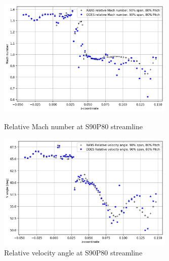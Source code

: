 \begin{figure}[ht]
  \centering
  \includegraphics[width=0.75\textwidth]{Pictures/mach-rel-S90-P80.png}
  \caption{Relative Mach number at S90P80 streamline} \label{mach-rel-S90-P80}
  \vspace*{\floatsep}%
  \includegraphics[width=0.75\textwidth]{Pictures/vang-rel-S90-P80.png}
  \caption{Relative velocity angle at S90P80 streamline} \label{vang-rel-S90-P80}
\end{figure}

